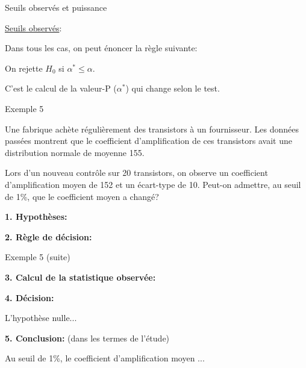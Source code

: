 \documentclass{BeamerTemplate}
\begin{document}

\begin{frame}[t]{Seuils observés et puissance}

\underline{Seuils observés}:

Dans tous les cas, on peut énoncer la règle suivante:

\centerline{\alert{On rejette $H_0$ si $\alpha^*\le\alpha$.}}

C'est le calcul de la valeur-P ($\alpha^*$) qui change selon le test.

\bigskip
{}
\end{frame}

\begin{frame}[t]{Exemple 5}

Une fabrique achète régulièrement des transistors à un fournisseur. Les données passées montrent que le coefficient d'amplification de ces transistors avait une distribution normale de moyenne 155.

\medskip

Lors d'un nouveau contrôle sur 20 transistors, on observe un coefficient d'amplification moyen de 152 et un écart-type de 10. Peut-on admettre, au seuil de 1\%, que le coefficient  moyen a changé?


\bigskip

{\bf 1. Hypothèses:}
\bigskip

{\bf 2. Règle de décision:}

\end{frame}

\begin{frame}[t]{Exemple 5 (suite)}

{\bf 3. Calcul de la statistique observée:}

\vfill
{\bf 4. Décision:}

L'hypothèse nulle...

\bigskip
{\bf 5. Conclusion:} (dans les termes de l'étude)

Au seuil de 1\%, le coefficient d'amplification moyen ...
\bigskip

\end{frame}
\end{document}
